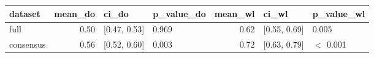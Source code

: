 \begin{table}[ht]
\centering
\label{tab:iu_freq}
\begin{tabular}{lrllrll}
  \hline
dataset & mean\_do & ci\_do & p\_value\_do & mean\_wl & ci\_wl & p\_value\_wl \\ 
  \hline
full & 0.50 & [0.47, 0.53] & 0.969 & 0.62 & [0.55, 0.69] & 0.005 \\ 
  consensus & 0.56 & [0.52, 0.60] & 0.003 & 0.72 & [0.63, 0.79] & $<$ 0.001 \\ 
   \hline
\end{tabular}
\end{table}
